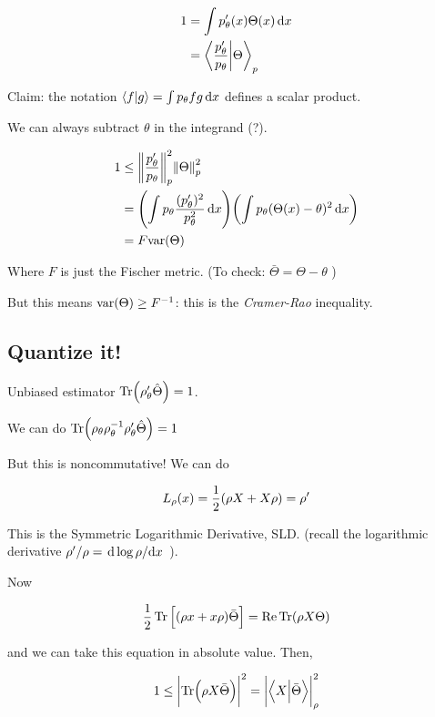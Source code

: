 \begin{align}
  1 &= \int  p' _\theta (x) \Theta (x) \dd{x}  \\
  &= \braket{\frac{p'_\theta}{p_\theta}}{\Theta}_p
\end{align}

Claim: the notation \( \braket{f}{g} = \int  p_\theta f g \dd{x}  \) defines a scalar product.

We can always subtract \( \theta \) in the integrand (?).

\begin{align}
  1 &\leq \norm{\frac{p_\theta '}{p_\theta}}^{2}_p \norm{\Theta}^2_p  \\
  &= \qty(\int  p_\theta \frac{(p_\theta ')^2}{p_\theta^2} \dd{x} )
  \qty(\int p_\theta (\Theta(x) - \theta)^2 \dd{x} )  \\
  &= F \text{var} \qty(\Theta)
\end{align}

Where \( F \) is just the Fischer metric. (To check: \( \bar{\Theta} = \Theta - \theta \) )

But this means \(\text{var} \qty(\Theta) \geq F ^{-1} \): this is the \emph{Cramer-Rao} inequality.

\subsection{Quantize it!}

Unbiased estimator \( \Tr (\rho_\theta ' \hat{\Theta}) = 1 \).

We can do \( \Tr (\rho_\theta \rho_\theta ^{-1} \rho_\theta ' \hat{\Theta}) = 1 \)

But this is noncommutative! We can do

\begin{equation} \label{eq:SLD-def}
  L_\rho (x)  = \frac{1}{2} \qty(\rho X + X \rho) = \rho'
\end{equation}

This is the Symmetric Logarithmic Derivative, SLD.
(recall the logarithmic derivative \( \rho' / \rho = \dv*{\log \rho}{x} \) ).

Now

\begin{equation}
  \frac{1}{2} \Tr \qty[\qty(\rho x + x \rho) \bar{\Theta}] = \Re \Tr (\rho X \Theta)
\end{equation}

and we can take this equation in absolute value. Then,

\begin{equation}
  1 \leq \abs{\Tr (\rho X \bar{\Theta})}^{2} = \abs{\braket{X}{\bar{\Theta}}}^{2}_{\rho}
\end{equation}

